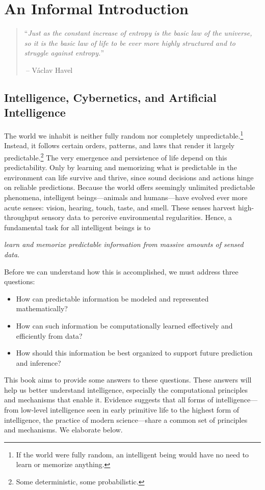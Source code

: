 \documentclass[../../book-main.tex]{subfiles}
\begin{document}
\chapter{An Informal Introduction}
\label{ch:intro}

\begin{quote}
``{\em Just as the constant increase of entropy is the basic law of the universe, so it is the basic law of life to be ever more highly structured and to struggle against entropy.}''

$~$\hfill -- V\'{a}clav Havel
 \end{quote}
\vspace{5mm}



\section{Intelligence, Cybernetics, and Artificial Intelligence}
The world we inhabit is neither fully random nor completely unpredictable.\footnote{If the world were fully random, an intelligent being would have no need to learn or memorize anything.} Instead, it follows certain orders, patterns, and laws that render it largely predictable.\footnote{Some deterministic, some probabilistic.} The very emergence and persistence of life depend on this predictability. Only by learning and memorizing what is predictable in the environment can life survive and thrive, since sound decisions and actions hinge on reliable predictions. Because the world offers seemingly unlimited predictable phenomena, intelligent beings---animals and humans---have evolved ever more acute senses: vision, hearing, touch, taste, and smell. These senses harvest high-throughput sensory data to perceive environmental regularities. Hence, a fundamental task for all intelligent beings is to
\begin{center}
    \textit{learn and memorize predictable information from massive amounts of sensed data}.
\end{center}
Before we can understand how this is accomplished, we must address three questions:
\begin{itemize}
    \item How can predictable information be modeled and represented mathematically?
    \item How can such information be computationally learned effectively and efficiently from data?
    \item How should this information be best organized to support future prediction and inference?
\end{itemize}
This book aims to provide some answers to these questions. These answers will help us better understand intelligence, especially the computational principles and mechanisms that enable it. Evidence suggests that all forms of intelligence---from low-level intelligence seen in early primitive life to the highest form of intelligence, the practice of modern science---share a common set of principles and mechanisms. We elaborate below.
\end{document}
